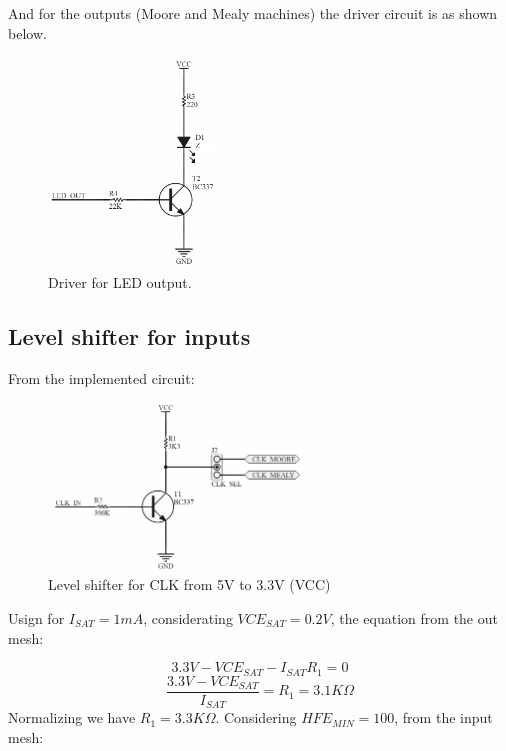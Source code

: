 And for the outputs (Moore and Mealy machines) 
the driver circuit is as shown below.

\begin{figure}[H]
    \begin{centering}
    \includegraphics[width=0.4\textwidth]{data/Graficos3/LED_Driver.png}
    \par\end{centering}
    \caption{Driver for LED output.}
\end{figure}

\subsection*{Level shifter for inputs}
From the implemented circuit:
\begin{figure}[H]
    \begin{centering}
    \includegraphics[width=0.6\textwidth]{data/Graficos3/CLK_Driver.png}
    \par\end{centering}
    \caption{Level shifter for CLK from 5V to 3.3V (VCC)}
\end{figure}

Usign for $I_{SAT} = 1mA$, considerating $VCE_{SAT} = 0.2V$, 
the equation from the out mesh:

$$3.3V - VCE_{SAT} - I_{SAT}R_1 = 0$$
$$\frac{3.3V - VCE_{SAT}}{I_{SAT}} = R_1 = 3.1K\Omega$$
Normalizing we have $R_1 = 3.3K\Omega$.
Considering $HFE_{MIN} = 100$, from the input mesh:

